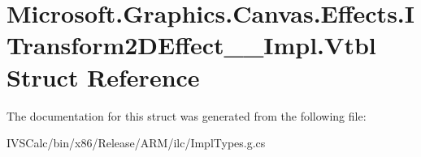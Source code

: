 \hypertarget{struct_microsoft_1_1_graphics_1_1_canvas_1_1_effects_1_1_i_transform2_d_effect_____impl_1_1_vtbl}{}\section{Microsoft.\+Graphics.\+Canvas.\+Effects.\+I\+Transform2\+D\+Effect\+\_\+\+\_\+\+Impl.\+Vtbl Struct Reference}
\label{struct_microsoft_1_1_graphics_1_1_canvas_1_1_effects_1_1_i_transform2_d_effect_____impl_1_1_vtbl}


The documentation for this struct was generated from the following file\+:\begin{DoxyCompactItemize}
\item 
I\+V\+S\+Calc/bin/x86/\+Release/\+A\+R\+M/ilc/Impl\+Types.\+g.\+cs\end{DoxyCompactItemize}
